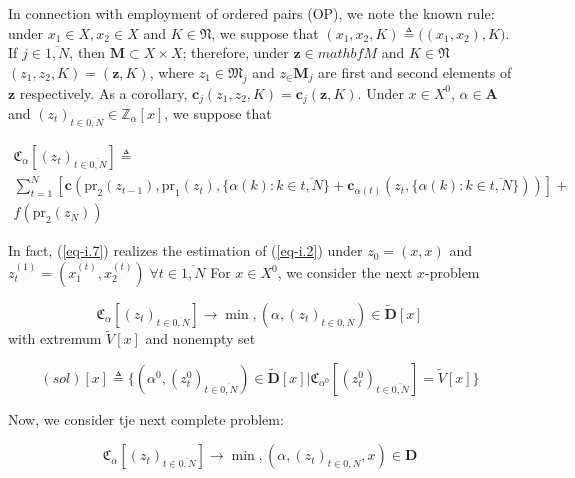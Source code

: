 \documentclass{article}
\begin{document}
In connection with employment of ordered pairs
(OP),
we note the known rule:
under
$x_1 \in X, x_2 \in X$
and
$K \in \mathfrak N$,
we suppose that
$(x_1, x_2, K) \triangleq \big( (x_1, x_2), K\big)$.
If
$j \in \overline{1,N}$,
then
$\mathbf M \subset X \times X$;
therefore, under
$\mathbf z \in mathbf M$
and
$K \in \mathfrak N$
$(z_1,z_2, K)=(\mathbf z, K)$,
where
$z_1 \in \mathfrak M_j$
and
$z_ \in \mathbf M_j$
are first and second elements of
$\mathbf z$
respectively.
As a corollary,
$\mathbf c_j(z_1, z_2, K) = \mathbf c_j(\mathbf z, K)$.
Under
$x \in X^0$,
$\alpha \in \mathbf A$
and
$(z_t)_{t \in \overline{0,N}} \in \mathbb Z_\alpha[x]$,
we suppose that

\begin{multline}
  \label{eq-i.7}
  \mathfrak C_\alpha[(z_t)_{t \in \overline{0,N}}]
  \triangleq \\
  \sum_{t=1}^N
  [
    \mathbf c(
      \mathrm{pr}_2(z_{t-1}),
      \mathrm{pr}_1(z_t),
      \{ \alpha(k) : k \in \overline{t, N} \}
      +
      \mathbf c_{\alpha(t)}(z_t, \{ \alpha(k) : k \in \overline{t,N}\})
      )
  ]
  + \\
  f(\mathrm{pr}_2(z_N))
\end{multline}

In fact,
(\ref{eq-i.7})
realizes the estimation of (\ref{eq-i.2})
under
$z_0 = (x,x)$
and
$z_t^{(1)} =(x_1^{(t)}, x_2^{(t)})
\;
\forall t \in \overline{1, N}$
For
$x \in X^0$,
we consider the next
$x$-problem

\begin{equation}
  \label{eq-i.8}
  \mathfrak C_\alpha[(z_t)_{t \in \overline{0,N}}]
  \to \min,
  (\alpha, (z_t)_{t \in \overline{0,N}}) \in \tilde{\mathbf D}[x]
\end{equation}
with extremum
$\tilde{V}[x]$
and nonempty set

\begin{equation}
  \label{eq-i.9}
  (sol)[x]
  \triangleq
  \{
    (\alpha^0, (z_t^0)_{t \in \overline{0,N}}) \in \tilde{\mathbf D}[x]
  |
    \mathfrak C_{\alpha^0}[(z_t^0)_{t \in \overline{0,N}}] = \tilde{V}[x]
  \}
\end{equation}

Now, we consider tje next complete problem:

\begin{equation}
  \label{eq-i.10}
  \mathfrak C_\alpha[(z_t)_{t \in \overline{0,N}}]
  \to \min,
  (\alpha, (z_t)_{t \in \overline{0,N}}, x) \in \mathbf D
\end{equation}
\end{document}
